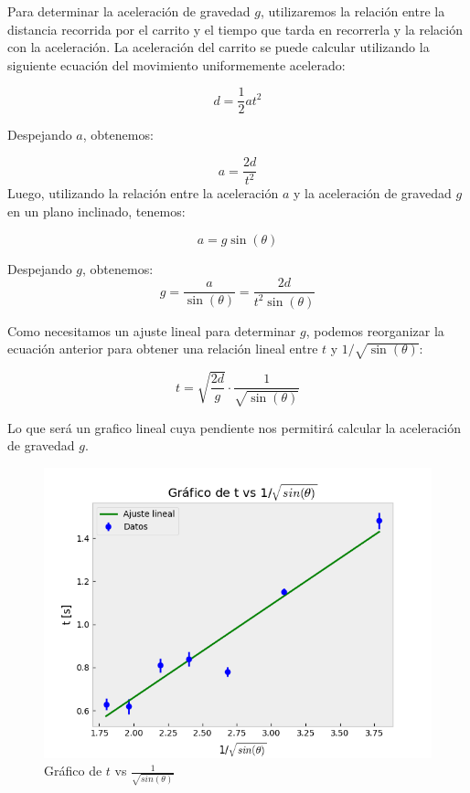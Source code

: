 \documentclass{article}
\begin{document}
\begin{multicols}{2}
    Para determinar la aceleración de gravedad $g$, utilizaremos la relación entre la distancia recorrida
    por el carrito y el tiempo que tarda en recorrerla y la relación con la aceleración. La aceleración
    del carrito se puede calcular utilizando la siguiente ecuación del movimiento uniformemente acelerado:

    \begin{equation}
        d = \frac{1}{2} a t^2
    \end{equation}

    Despejando $a$, obtenemos:

    \begin{equation}
        a = \frac{2d}{t^2}
    \end{equation}
    Luego, utilizando la relación entre la aceleración $a$ y la aceleración de gravedad $g$ en un plano
    inclinado, tenemos:

    \begin{equation}
        a = g \sin(\theta)
    \end{equation}

    Despejando $g$, obtenemos:
    \begin{equation}
        g = \frac{a}{\sin(\theta)} = \frac{2d}{t^2 \sin(\theta)}
    \end{equation}

    Como necesitamos un ajuste lineal para determinar $g$, podemos reorganizar la ecuación anterior para obtener una
    relación lineal entre $t$ y $1/\sqrt{\sin(\theta)}$:

    \begin{equation}
        t = \sqrt{\frac{2d}{g}} \cdot \frac{1}{\sqrt{\sin(\theta)}}
    \end{equation}

    Lo que será un grafico lineal cuya pendiente nos permitirá calcular la aceleración de gravedad $g$.

    \begin{figure}[H]
        \includegraphics[width=\linewidth]{graf_gravedad.png}
    \caption{Gráfico de $t$ vs $\frac{1}{\sqrt{sin(\theta)}}$}
    \label{fig:plano_inclinado}
    \end{figure}


\end{multicols}
\end{document}
